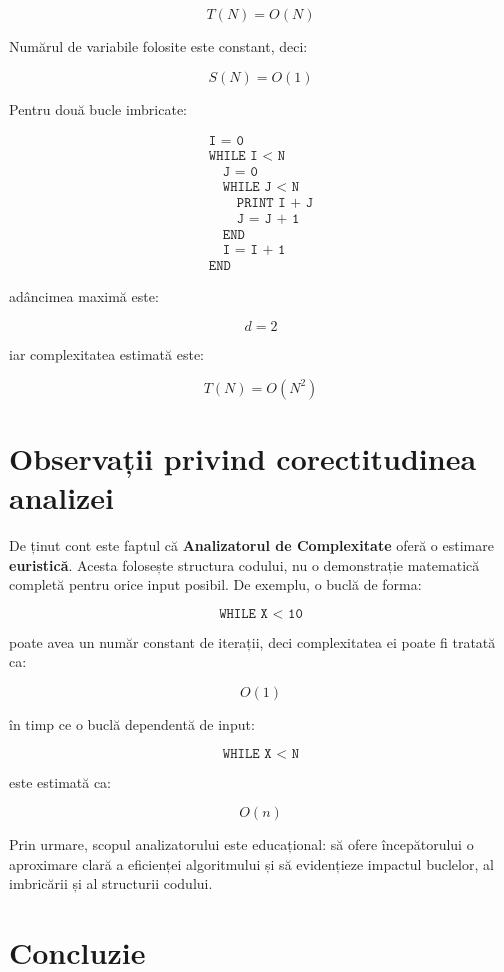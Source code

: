 \documentclass[12pt]{article}
\begin{document}
\[
T(N) = O(N)
\]

Numărul de variabile folosite este constant, deci:

\[
S(N) = O(1)
\]

Pentru două bucle imbricate:

\[
\begin{array}{l}
\texttt{I = 0} \\
\texttt{WHILE I < N} \\
\quad \texttt{J = 0} \\
\quad \texttt{WHILE J < N} \\
\quad \quad \texttt{PRINT I + J} \\
\quad \quad \texttt{J = J + 1} \\
\quad \texttt{END} \\
\quad \texttt{I = I + 1} \\
\texttt{END}
\end{array}
\]

adâncimea maximă este:

\[
d = 2
\]

iar complexitatea estimată este:

\[
T(N) = O(N^2)
\]

\section{Observații privind corectitudinea analizei}

De ținut cont este faptul că \textbf{Analizatorul de Complexitate} oferă o estimare \textbf{euristică}. Acesta folosește structura codului, nu o demonstrație matematică completă pentru orice input posibil. De exemplu, o buclă de forma:

\[
\texttt{WHILE X < 10}
\]

poate avea un număr constant de iterații, deci complexitatea ei poate fi tratată ca:

\[
O(1)
\]

în timp ce o buclă dependentă de input:

\[
\texttt{WHILE X < N}
\]

este estimată ca:

\[
O(n)
\]

Prin urmare, scopul analizatorului este educațional: să ofere începătorului o aproximare clară a eficienței algoritmului și să evidențieze impactul buclelor, al imbricării și al structurii codului.

\section{Concluzie}
\end{document}
